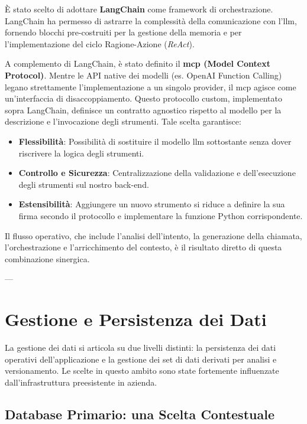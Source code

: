 È stato scelto di adottare \textbf{LangChain} come framework di orchestrazione. LangChain ha permesso di astrarre la complessità della comunicazione con l'\gls{llm}, fornendo blocchi pre-costruiti per la gestione della memoria e per l'implementazione del ciclo Ragione-Azione (\textit{ReAct}).

A complemento di LangChain, è stato definito il \textbf{\gls{mcp} (Model Context Protocol)}. Mentre le API native dei modelli (es. OpenAI Function Calling) legano strettamente l'implementazione a un singolo provider, il \gls{mcp} agisce come un'interfaccia di disaccoppiamento. Questo protocollo custom, implementato sopra LangChain, definisce un contratto agnostico rispetto al modello per la descrizione e l'invocazione degli strumenti. Tale scelta garantisce:
\begin{itemize}
    \item \textbf{Flessibilità}: Possibilità di sostituire il modello \gls{llm} sottostante senza dover riscrivere la logica degli strumenti.
    \item \textbf{Controllo e Sicurezza}: Centralizzazione della validazione e dell'esecuzione degli strumenti sul nostro back-end.
    \item \textbf{Estensibilità}: Aggiungere un nuovo strumento si riduce a definire la sua firma secondo il protocollo e implementare la funzione Python corrispondente.
\end{itemize}
Il flusso operativo, che include l'analisi dell'intento, la generazione della chiamata, l'orchestrazione e l'arricchimento del contesto, è il risultato diretto di questa combinazione sinergica.

---

\section{Gestione e Persistenza dei Dati}
\label{sec:data_persistence}

La gestione dei dati si articola su due livelli distinti: la persistenza dei dati operativi dell'applicazione e la gestione dei set di dati derivati per analisi e versionamento. Le scelte in questo ambito sono state fortemente influenzate dall'infrastruttura preesistente in azienda.

\subsection{Database Primario: una Scelta Contestuale}

